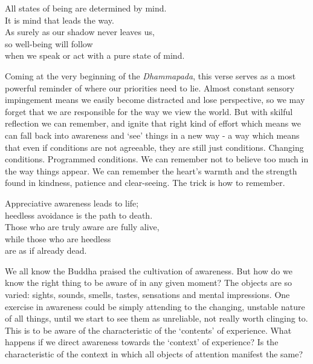 

\begin{dhpVerse}{2}
\label{dhp-2}
All states of being are determined by mind.\\
It is mind that leads the way.\\
As surely as our shadow never leaves us,\\
so well-being will follow\\
when we speak or act with a pure state of mind.
\end{dhpVerse}

\begin{dhpRefl}
  Coming at the very beginning of the \emph{Dhammapada}, this verse serves as a
  most powerful reminder of where our priorities need to lie. Almost constant
  sensory impingement means we easily become distracted and lose perspective, so
  we may forget that we are responsible for the way we view the world. But with
  skilful reflection we can remember, and ignite that right kind of effort which
  means we can fall back into awareness and ‘see’ things in a new way - a way
  which means that even if conditions are not agreeable, they are still just
  conditions. Changing conditions. Programmed conditions. We can remember not to
  believe too much in the way things appear. We can remember the heart’s warmth
  and the strength found in kindness, patience and clear-seeing. The trick is
  how to remember.
\end{dhpRefl}


\begin{dhpVerse}{21}
\label{dhp-21}
Appreciative awareness leads to life;\\
heedless avoidance is the path to death.\\
Those who are truly aware are fully alive,\\
while those who are heedless\\
are as if already dead.
\end{dhpVerse}

\begin{dhpRefl}
  We all know the Buddha praised the cultivation of awareness. But how do we
  know the right thing to be aware of in any given moment? The objects are so
  varied: sights, sounds, smells, tastes, sensations and mental impressions. One
  exercise in awareness could be simply attending to the changing, unstable
  nature of all things, until we start to see them as unreliable, not really
  worth clinging to. This is to be aware of the characteristic of the ‘contents’
  of experience. What happens if we direct awareness towards the ‘context’ of
  experience? Is the characteristic of the context in which all objects of
  attention manifest the same?
\end{dhpRefl}

